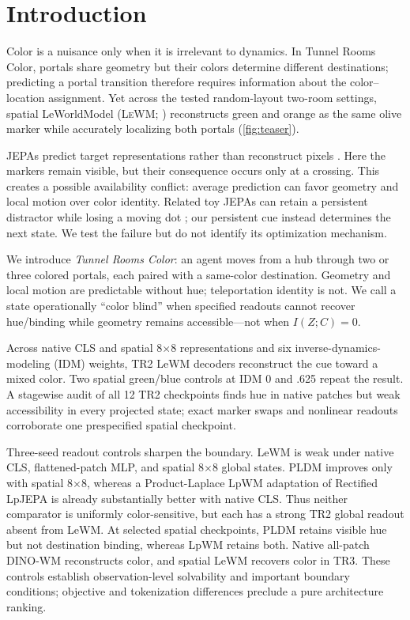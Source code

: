 \documentclass{article}
\newcommand{\lewm}{\textsc{LeWM}}
\newcommand{\dinowm}{\textsc{DINO-WM}}
\begin{document}
\section{Introduction}

Color is a nuisance only when it is irrelevant to dynamics.  In Tunnel Rooms
Color, portals share geometry but their colors determine different
destinations; predicting a portal transition therefore requires information
about the color--location assignment.  Yet across the tested random-layout
two-room settings, spatial LeWorldModel (\lewm{}; \citealp{maes2026leworldmodel})
reconstructs green and orange as the same olive marker while accurately
localizing both portals (\cref{fig:teaser}).

JEPAs predict target representations rather than reconstruct pixels
\citep{lecun2022path,assran2023ijepa,bardes2024vjepa}.  Here the markers remain
visible, but their consequence occurs only at a crossing.  This creates a
possible availability conflict: average prediction can favor geometry and
local motion over color identity.  Related toy JEPAs can retain a persistent
distractor while losing a moving dot \citep{sobal2022slow}; our persistent cue
instead determines the next state.  We test the failure but do not identify its
optimization mechanism.

We introduce \emph{Tunnel Rooms Color}: an agent moves from a hub through two
or three colored portals, each paired with a same-color destination.  Geometry
and local motion are predictable without hue; teleportation identity is not.
We call a state operationally ``color blind'' when specified readouts cannot
recover hue/binding while geometry remains accessible---not when
$I(Z;C)=0$.

Across native CLS and spatial 8$\times$8 representations and six
inverse-dynamics-modeling (IDM) weights, TR2 LeWM decoders reconstruct the cue
toward a mixed color.  Two spatial green/blue controls at IDM 0 and .625 repeat
the result.  A stagewise audit of all 12 TR2 checkpoints finds hue in native
patches but weak accessibility in every projected state; exact marker swaps
and nonlinear readouts corroborate one prespecified spatial checkpoint.

Three-seed readout controls sharpen the boundary.  LeWM is weak under native
CLS, flattened-patch MLP, and spatial 8$\times$8 global states.  PLDM
\citep{sobal2025latentplanning} improves only with spatial 8$\times$8, whereas
a Product-Laplace LpWM adaptation of Rectified LpJEPA
\citep{kuang2026rectified} is already substantially better with native CLS.
Thus neither comparator is uniformly color-sensitive, but each has a strong
TR2 global readout absent from LeWM.  At selected spatial checkpoints, PLDM
retains visible hue but not destination binding, whereas LpWM retains both.
Native all-patch \dinowm{}
\citep{zhou2025dinowm} reconstructs color, and spatial LeWM recovers color in
TR3.  These controls establish observation-level solvability and important
boundary conditions; objective and tokenization differences preclude a pure
architecture ranking.
\end{document}
